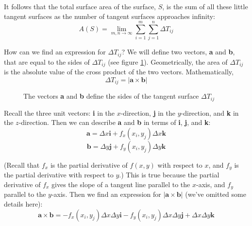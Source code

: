 It follows that the total surface area of the surface, $S$, is the sum of all 
these little tangent surfaces as the number of tangent surfaces approaches 
infinity:
$$A(S) = \lim_{m, n \to \infty} \sum_{i = 1}^m \sum_{j = 1}^n \Delta T_{ij}$$

How can we find an expression for $\Delta T_{ij}$? We will define two vectors, 
\textbf{a} and \textbf{b}, that are equal to the sides of $\Delta T_{ij}$ (see 
figure \ref{fig:vectors}). Geometrically, the area of $\Delta T_{ij}$ is the 
absolute value of the cross product of the two vectors. Mathematically, 
$$\Delta T_{ij} = |\textbf{a} \times \textbf{b}|$$

\begin{figure}[htbp]
    \centering
    \caption{The vectors \textbf{a} and \textbf{b} define the sides of the 
    tangent surface $\Delta T_{ij}$}
    \label{fig:vectors}
\end{figure}

Recall the three unit vectors: \textbf{i} in the $x$-direction, \textbf{j} in 
the $y$-direction, and \textbf{k} in the $z$-direction. Then we can describe 
\textbf{a} and \textbf{b} in terms of \textbf{i}, \textbf{j}, and \textbf{k}:
$$\textbf{a} = \Delta x \textbf{i} + f_x(x_i, y_j) \Delta x \textbf{k}$$
$$\textbf{b} = \Delta y \textbf{j} + f_y(x_i, y_j) \Delta y \textbf{k}$$

(Recall that $f_x$ is the partial derivative of $f(x, y)$ with respect to $x$, 
and $f_y$ is the partial derivative with respect to $y$.) This is true because 
the partial derivative of $f_x$ gives the slope of a tangent line parallel to 
the $x$-axis, and $f_y$ parallel to the $y$-axis. Then we find an expression 
for $| \textbf{a} \times \textbf{b} |$ (we've omitted some details here):
$$\textbf{a} \times \textbf{b} = -f_x(x_i, y_j) \Delta x \Delta y \textbf{i} - 
f_y(x_i, y_j) \Delta x \Delta y \textbf{j} + \Delta x \Delta y \textbf{k}$$

